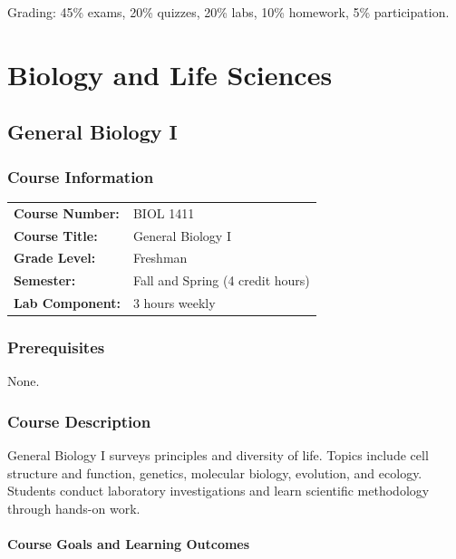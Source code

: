 \documentclass[12pt,oneside]{book}
\begin{document}
Grading: 45\% exams, 20\% quizzes, 20\% labs, 10\% homework, 5\% participation.


\part{Biology and Life Sciences}

\chapter{General Biology I}

\section{Course Information}

\begin{tabular}{ll}
\textbf{Course Number:} & BIOL 1411 \\
\textbf{Course Title:} & General Biology I \\
\textbf{Grade Level:} & Freshman \\
\textbf{Semester:} & Fall and Spring (4 credit hours) \\
\textbf{Lab Component:} & 3 hours weekly \\
\end{tabular}

\section{Prerequisites}

None.

\section{Course Description}

General Biology I surveys principles and diversity of life. Topics include cell structure and function, genetics, molecular biology, evolution, and ecology. Students conduct laboratory investigations and learn scientific methodology through hands-on work.

\subsection{Course Goals and Learning Outcomes}
\end{document}
